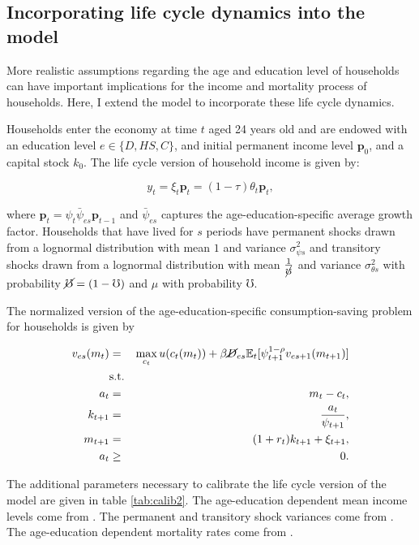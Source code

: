  
\subsection{Incorporating life cycle dynamics into the model}

\par More realistic assumptions regarding the age and education level of households can have important implications for the income and mortality process of households. Here, I extend the model to incorporate these life cycle dynamics.

\par Households enter the economy at time $t$ aged 24 years old and are endowed with an education level $e \in \{D,HS,C\}$, and initial permanent income level $\textbf{p}_0$, and a capital stock $k_0$. The life cycle version of household income is given by:

$$ y_t = \xi_t \textbf{p}_t = (1 - \tau) \theta_t \textbf{p}_t, $$

where $\textbf{p}_t = \psi_t \bar{\psi}_{es} \textbf{p}_{t-1}$ and $\bar{\psi}_{es}$ captures the age-education-specific average growth factor. Households that have lived for $s$ periods have permanent shocks drawn from a lognormal distribution with mean $1$ and variance $\sigma^{2}_{\psi s}$ and transitory shocks drawn from a lognormal distribution with mean $\frac{1}{\cancel{\mho}}$ and variance $\sigma^{2}_{\theta s}$ with probability $\cancel{\mho} = (1-\mho)$ and $\mu$ with probability $\mho$.

\par The normalized version of the age-education-specific consumption-saving problem for households is given by

\begin{eqnarray*}
  v_{es}(m_t) &=& \max_{c_t} u(c_t(m_t)) + \beta \cancel{D}_{es} \mathbb{E}_{t}[\psi_{t+1}^{1-\rho}v_{es + 1}(m_{t+1})] \\
  &\text{s.t.}& \\
  a_t &=& m_t - c_t, \\
  k_{t+1} &=& \frac{a_t}{\psi_{t+1}}, \\
  m_{t+1} &=& (1 + r_t)k_{t+1} + \xi_{t+1}, \\
  a_t &\geq& 0.
\end{eqnarray*}

\par The additional parameters necessary to calibrate the life cycle version of the model are given in table \ref{tab:calib2}. The age-education dependent mean income levels come from \cite{Cagetti2003}. The permanent and transitory shock variances come from \cite{Sabelhaus2010}. The age-education dependent mortality rates come from \cite{Brown2007}.

